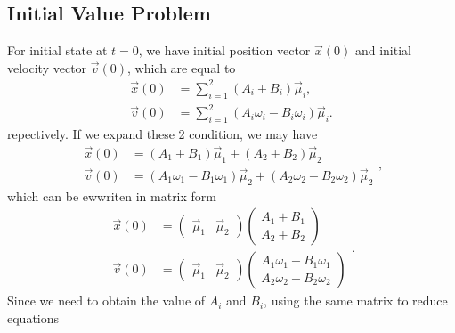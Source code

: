 \documentclass[12pt]{article}%
\begin{document}
	\subsection{Initial Value Problem}
	For initial state at $t=0$, we have initial position vector $\vec{x}\left(0\right)$ and initial velocity vector $\vec{v}\left(0\right)$, which are equal to
	\begin{equation}
	\begin{aligned}
	\vec{x}\left(0\right) &= \sum_{i=1}^{2}\left(A_{i}+ B_{i}\right)\vec{\mu}_i,
	\\
	\vec{v}\left(0\right) &= \sum_{i=1}^{2}\left(A_{i}\omega_i-B_{i}\omega_i\right)\vec{\mu}_i.
	\end{aligned}
	\end{equation}
	repectively. If we expand these 2 condition, we may have
	\begin{equation}
	\begin{aligned}
	\vec{x}\left(0\right) &= \left(A_{1}+ B_{1}\right)\vec{\mu}_1+\left(A_{2}+ B_{2}\right)\vec{\mu}_2
	\\
	\vec{v}\left(0\right) &= \left(A_{1}\omega_1-B_{1}\omega_1\right)\vec{\mu}_2+\left(A_{2}\omega_2-B_{2}\omega_2\right)\vec{\mu}_2
	\end{aligned},
	\end{equation}
	which can be ewwriten in matrix form
	\begin{equation}
	\begin{aligned}
	\vec{x}\left(0\right) &= \begin{pmatrix}\vec{\mu}_{1}&\vec{\mu}_{2}\end{pmatrix}\begin{pmatrix}A_{1}+B_{1}\\A_{2}+B_{2}\end{pmatrix}
	\\
	\vec{v}\left(0\right) &= 
	\begin{pmatrix}\vec{\mu}_{1}&\vec{\mu}_{2}\end{pmatrix}
	\begin{pmatrix}A_{1}\omega_1-B_{1}\omega_1\\A_{2}\omega_2-B_{2}\omega_2\end{pmatrix}
	\end{aligned}.
	\end{equation}
	Since we need to obtain the value of $A_{i}$ and $B_{i}$, using the same matrix to reduce equations
\end{document}

